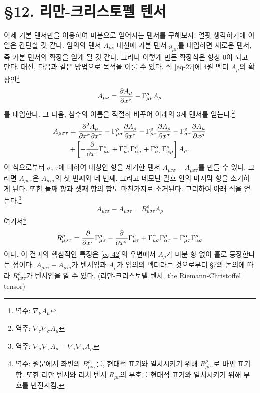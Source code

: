 \documentclass[b5paper]{article}
\begin{document}
\section*{\S 12. 리만-크리스토펠 텐서}
이제 기본 텐서만을 이용하여 미분으로 얻어지는 텐서를 구해보자. 얼핏 생각하기에 이 일은 간단할 것 같다. 임의의 텐서 $A_{\mu\nu}$ 대신에 기본 텐서 $g_{\mu\nu}$를 대입하면 새로운 텐서, 즉 기본 텐서의 확장을 얻게 될 것 같다. 그러나 이렇게 만든 확장식은 항상 0이 되고 만다. 대신, 다음과 같은 방법으로 목적을 이룰 수 있다. 식 \eqref{eq-27}에 4원 벡터 $A_\mu$의 확장인\footnote{역주: $\nabla_\nu A_\mu$}
\begin{equation*}
	A_{\mu\nu}={\frac{{\partial}{A_\mu}}{{\partial}{x^\nu}}}-\Gamma_{\mu\nu}^\rho A_\rho
\end{equation*}
를 대입한다. 그 다음, 첨수의 이름을 적절히 바꾸어 아래의 3계 텐서를 얻는다.\footnote{역주: $\nabla_\tau \nabla_\sigma A_\mu$}
\begin{gather*}
	A_{\mu\sigma\tau}={\frac{{\partial^2}{A_\mu}}{{\partial}{x^\sigma}{\partial}{x^\tau}}}
	-\Gamma_{\mu\sigma}^{\rho}{\frac{{\partial}{A_\rho}}{{\partial}{x^\tau}}}
	-\Gamma_{\mu\tau}^{\rho}{\frac{{\partial}{A_\rho}}{{\partial}{x^\sigma}}}
	-\Gamma_{\sigma\tau}^{\rho}{\frac{{\partial}{A_\mu}}{{\partial}{x^\rho}}}\\
	+\left[
	-{\frac{{\partial}{}}{{\partial}{x^\tau}}}\Gamma_{\mu\sigma}^{\rho}
	+\Gamma_{\mu\tau}^{\alpha}\Gamma_{\alpha\sigma}^{\rho}
	+\Gamma_{\sigma\tau}^{\alpha}\Gamma_{\alpha\mu}^{\rho}
	\right] A_\rho .
\end{gather*}
이 식으로부터 $\sigma$, $\tau$에 대하여 대칭인 항을 제거한 텐서 $A_{\mu\tau\sigma}-A_{\mu\sigma\tau}$를 만들 수 있다.
 그러면 $A_{\mu\sigma\tau}$은 $A_{\mu\tau\sigma}$의 첫 번째와 네 번째, 그리고 네모난 괄호 안의 마지막 항을 소거하게 된다. 또한 둘째 항과 셋째 항의 합도 마찬가지로 소거된다. 그리하여 아래 식을 얻는다.\footnote{역주: $\nabla_\sigma \nabla_\tau A_\mu - \nabla_\tau \nabla_\sigma A_\mu
 	$}
\begin{equation} \label{eq-42}
	A_{\mu\tau\sigma}-A_{\mu\sigma\tau}
	= R_{\mu\sigma\tau}^\rho A_\rho
\end{equation} 
여기서\footnote{역주: 원문에서 좌변의 $B_{\mu\sigma\tau}^\rho$를, 현대적 표기와 일치시키기 위해 $R_{\mu\sigma\tau}^\rho$로 바꿔 표기함. 또한 리만 텐서와 리치 텐서 $R_{\mu\nu}$의 부호를 현대적 표기와 일치시키기 위해 부호를 반전시킴.} 
\begin{equation} \label{eq-43}
	R_{\mu\sigma\tau}^\rho = {\frac{{\partial}{}}{{\partial}{x^\tau}}}\Gamma_{\mu\sigma}^{\rho}
	- {\frac{{\partial}{}}{{\partial}{x^\sigma}}}\Gamma_{\mu\tau}^{\rho}
	+ \Gamma_{\mu\sigma}^{\alpha}\Gamma_{\alpha\tau}^{\rho}
	- \Gamma_{\mu\tau}^{\alpha}\Gamma_{\alpha\sigma}^{\rho}
\end{equation}
이다. 이 결과의 핵심적인 특징은 \eqref{eq-42}의 우변에서 $A_\rho$가 미분 항 없이 홀로 등장한다는 점이다. $A_{\mu\sigma\tau}-A_{\mu\tau\sigma}$가 텐서임과 $A_\rho$가 임의의 벡터라는 것으로부터 \S 7의 논의에 따라 $R_{\mu\sigma\tau}^\rho$가 텐서임을 알 수 있다. (리만-크리스토펠 텐서, the Riemann-Christoffel tensor)
\end{document}
